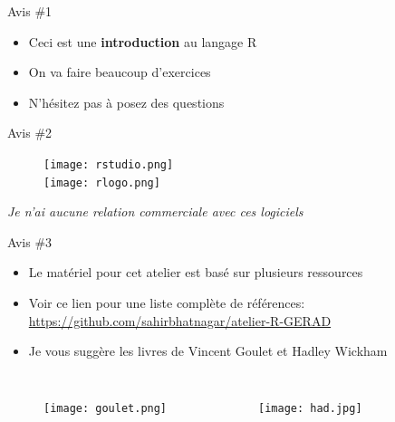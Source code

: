 \documentclass[11pt]{beamer}\usepackage[]{graphicx}\usepackage[]{color}
\begin{document}
\begin{frame}{Avis \#1}
\begin{itemize}
\item Ceci est une \textbf{introduction} au langage R
\pause \item On va faire beaucoup d'exercices
\pause \item N'h\'{e}sitez pas \`{a} posez des questions
\end{itemize}
\end{frame}

\begin{frame}{Avis \#2}
\begin{figure}
\texttt{[image: rstudio.png]}\\[5mm]
\texttt{[image: rlogo.png]}\\[5mm]
\end{figure}

\textit{Je n'ai aucune relation commerciale avec ces logiciels}

\end{frame}

\begin{frame}{Avis \#3}

\begin{itemize}
\item Le mat\'{e}riel pour cet atelier est bas\'{e} sur plusieurs ressources
\item Voir ce lien pour une liste compl\`{e}te de r\'{e}f\'{e}rences: \href{https://github.com/sahirbhatnagar/atelier-R-GERAD}{https://github.com/sahirbhatnagar/atelier-R-GERAD}
\item Je vous sugg\`{e}re les livres de Vincent Goulet et Hadley Wickham
\end{itemize}

\begin{columns}[c] %
\begin{figure}
\texttt{[image: goulet.png]}
\end{figure}

\begin{figure}
\texttt{[image: had.jpg]}
\end{figure}
\end{columns}

\end{frame}
\end{document}
